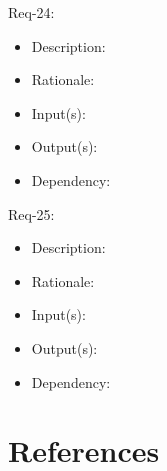 \documentclass[12pt]{article}
\begin{document}
Req-24: 
\begin{itemize}
    \item Description: 
    \item Rationale: 
    \item Input(s): 
    \item Output(s): 
    \item Dependency: 
\end{itemize}
Req-25: 
\begin{itemize}
    \item Description: 
    \item Rationale: 
    \item Input(s): 
    \item Output(s): 
    \item Dependency: 
\end{itemize}
\section{References}

\begingroup
\renewcommand{\section}[2]{}
\begin{thebibliography}{10}

    \bigskip


\end{thebibliography}
\endgroup
\end{document}
